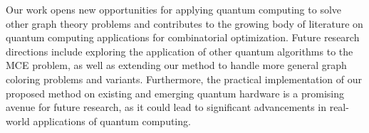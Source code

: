 Our work opens new opportunities for applying quantum computing to solve other graph theory problems and contributes to the growing body of literature on quantum computing applications for combinatorial optimization. Future research directions include exploring the application of other quantum algorithms to the MCE problem, as well as extending our method to handle more general graph coloring problems and variants. Furthermore, the practical implementation of our proposed method on existing and emerging quantum hardware is a promising avenue for future research, as it could lead to significant advancements in real-world applications of quantum computing.

